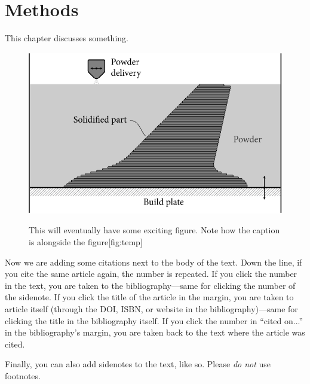 \chapter{Methods}\label{chap:methods}

This
%
chapter discusses something. \lipsum[1]

\begin{figure}[ht]
   \begin{fullwidthfig}
     \includegraphics[width=0.9\fullwidth]{figures/example/powder_based}
   \end{fullwidthfig}
\end{figure}

 \lipsum[2]

 \begin{figure}[ht]
   \begin{sidecaption}{This will eventually have some exciting figure. Note how the caption is alongside the figure}[fig:temp]
     \todofig
   \end{sidecaption}
 \end{figure}

Now we are adding some citations next to the body of the text.\cite{drela1999integrated,theodorsen1935general,weissinger_naca}
\lipsum[3]
Down the line, if you cite the same article again, the number is repeated.\cite{drela1999integrated}
If you click the number in the text, you are taken to the bibliography---same for clicking the number of the sidenote.
If you click the title of the article in the margin, you are taken to article itself (through the DOI, ISBN, or website in the bibliography)---same for clicking the title in the bibliography itself.
If you click the number in ``cited on...'' in the bibliography's margin, you are taken back to the text where the article was cited.

Finally, you can also add sidenotes to the text, like so.
Please \textit{do not} use footnotes.
